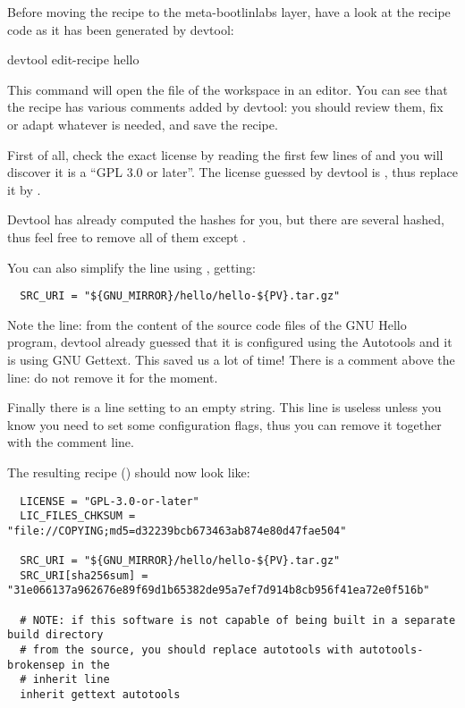 Before moving the recipe to the meta-bootlinlabs layer, have a look at the
recipe code as it has been generated by devtool:

\begin{bashinput}
devtool edit-recipe hello
\end{bashinput}

This command will open the  file of the workspace in an
editor. You can see that the recipe has various comments added by devtool:
you should review them, fix or adapt whatever is needed, and save the
recipe.

First of all, check the exact license by reading the first few lines of
 and you will discover it is a
``GPL 3.0 or later''. The license guessed by devtool is
, thus replace it by .

Devtool has already computed the hashes for you, but there are several
 hashed, thus feel free to remove all of them except
.

You can also simplify the  line using ,
getting:
\begin{verbatim}
  SRC_URI = "${GNU_MIRROR}/hello/hello-${PV}.tar.gz"
\end{verbatim}

Note the  line: from the content of the source code files of
the GNU Hello program, devtool already guessed that it is configured using
the Autotools and it is using GNU Gettext. This saved us a lot of time!
There is a comment above the  line: do not remove it for the
moment.

Finally there is a line setting  to an empty
string. This line is useless unless you know you need to set some
configuration flags, thus you can remove it together with the comment line.

The resulting recipe () should
now look like:
\begin{verbatim}
  LICENSE = "GPL-3.0-or-later"
  LIC_FILES_CHKSUM = "file://COPYING;md5=d32239bcb673463ab874e80d47fae504"

  SRC_URI = "${GNU_MIRROR}/hello/hello-${PV}.tar.gz"
  SRC_URI[sha256sum] = "31e066137a962676e89f69d1b65382de95a7ef7d914b8cb956f41ea72e0f516b"

  # NOTE: if this software is not capable of being built in a separate build directory
  # from the source, you should replace autotools with autotools-brokensep in the
  # inherit line
  inherit gettext autotools
\end{verbatim}

